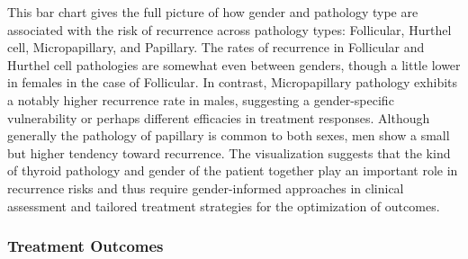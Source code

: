 \documentclass[12pt]{article}
\begin{document}
\begin{enumerate}
    This bar chart  gives the full picture of how gender and pathology type are associated with the risk of recurrence across pathology types: Follicular, Hurthel cell, Micropapillary, and Papillary. The rates of recurrence in Follicular and Hurthel cell pathologies are somewhat even between genders, though a little lower in females in the case of Follicular. In contrast, Micropapillary pathology exhibits a notably higher recurrence rate in males, suggesting a gender-specific vulnerability or perhaps different efficacies in treatment responses. Although generally the pathology of papillary is common to both sexes, men show a small but higher tendency toward recurrence. The visualization suggests that the kind of thyroid pathology and gender of the patient together play an important role in recurrence risks and thus require gender-informed approaches in clinical assessment and tailored treatment strategies for the optimization of outcomes.
    
\end{enumerate}

\newpage
\subsubsection{Treatment Outcomes}
\end{document}
